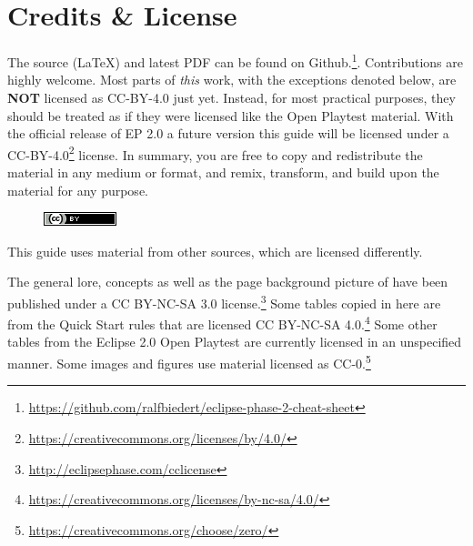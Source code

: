 \section*{Credits \& License}


\begin{itemize}
    \itembox The source (LaTeX) and latest PDF can be found on Github.\footnote{\url{https://github.com/ralfbiedert/eclipse-phase-2-cheat-sheet}}. Contributions are highly welcome.
    \itembox Most parts of \textit{this} work, with the exceptions denoted below, are \textbf{NOT} licensed as CC-BY-4.0 just yet. Instead, for most practical purposes, they should be treated as if they were licensed like the Open Playtest material.
    \itembox With the official release of EP 2.0 a future version this guide will be licensed under a  CC-BY-4.0\footnote{\url{https://creativecommons.org/licenses/by/4.0/}} license. In summary, you are free to copy and redistribute the material in any medium or format, and remix, transform, and build upon the material
    for any purpose.

     \begin{figure}[H]
         \centering
         \includegraphics{gfx/license}\\
     \end{figure}
\end{itemize}

This guide uses material from other sources, which are licensed differently.

\begin{itemize}
    \itembox The general lore, concepts as well as the page background picture of \eclipsephase have been published under a CC BY-NC-SA 3.0 license.\footnote{\url{http://eclipsephase.com/cclicense}}
    \itembox Some tables copied in here are from the  Quick Start rules that are licensed CC BY-NC-SA 4.0.\footnote{\url{https://creativecommons.org/licenses/by-nc-sa/4.0/}} Some other tables from the Eclipse 2.0 Open Playtest are currently licensed in an unspecified manner.
    \itembox Some images and figures use material licensed as CC-0.\footnote{\url{https://creativecommons.org/choose/zero/}}
\end{itemize}
